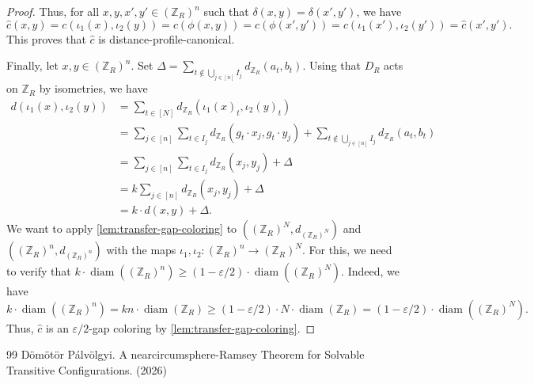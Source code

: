 \documentclass[10pt,a4paper]{amsart}
\DeclareMathOperator{\diam}{diam}
\begin{document}
\begin{proof}
    Thus, for all $x, y, x', y' \in (\mathbb{Z}_R)^n$ such that $\delta(x, y) = \delta(x', y')$, we have \[\widehat{c}(x, y) = c(\iota_1(x), \iota_2(y)) = c(\phi(x, y)) = c(\phi(x', y')) = c(\iota_1(x'), \iota_2(y')) = \widehat{c}(x', y').\]
    This proves that $\widehat{c}$ is distance-profile-canonical.
    
    Finally, let $x, y \in (\mathbb{Z}_R)^n$.
    Set $\Delta = \sum_{t \notin \bigcup_{j \in [n]}I_j}d_{\mathbb{Z}_R}(a_t, b_t)$.
    Using that $D_R$ acts on $\mathbb{Z}_R$ by isometries, we have \begin{align*}
        d(\iota_1(x), \iota_2(y)) &= \sum_{t \in [N]}d_{\mathbb{Z}_R}(\iota_1(x)_t, \iota_2(y)_t) \\
            &= \sum_{j \in [n]}\sum_{t \in I_j} d_{\mathbb{Z}_R}(g_t \cdot x_j, g_t \cdot y_j) + \sum_{t \notin \bigcup_{j \in [n]}I_j}d_{\mathbb{Z}_R}(a_t, b_t) \\
            &= \sum_{j \in [n]}\sum_{t \in I_j} d_{\mathbb{Z}_R}(x_j, y_j) + \Delta \\
            &= k \sum_{j \in [n]}d_{\mathbb{Z}_R}(x_j, y_j) + \Delta \\
            &= k \cdot d(x, y) + \Delta.
    \end{align*} 
    We want to apply \cref{lem:transfer-gap-coloring} to $((\mathbb{Z}_R)^N, d_{(\mathbb{Z}_R)^N})$ and $((\mathbb{Z}_R)^n, d_{(\mathbb{Z}_R)^n})$ with the maps $\iota_1, \iota_2 : (\mathbb{Z}_R)^n \to (\mathbb{Z}_R)^N$.
    For this, we need to verify that $k \cdot \diam((\mathbb{Z}_R)^n) \geq (1 - \varepsilon/2) \cdot \diam((\mathbb{Z}_R)^N)$.
    Indeed, we have \[k \cdot \diam((\mathbb{Z}_R)^n) = kn \cdot \diam(\mathbb{Z}_R) \geq (1 - \varepsilon/2) \cdot N \cdot \diam(\mathbb{Z}_R) = (1 - \varepsilon/2) \cdot \diam((\mathbb{Z}_R)^N).\]
    Thus, $\widehat{c}$ is an $\varepsilon/2$-gap coloring by \cref{lem:transfer-gap-coloring}.
\end{proof}

\begin{thebibliography}{99}
 Dömötör Pálvölgyi. A nearcircumsphere-{R}amsey Theorem for Solvable Transitive Configurations. (2026)
\end{thebibliography}
\end{document}

